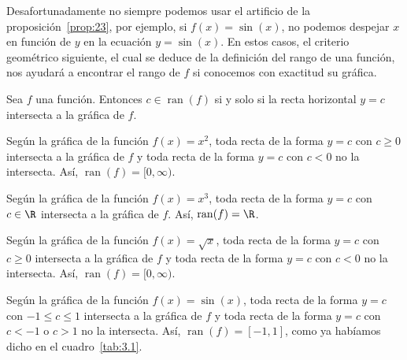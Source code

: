 \documentclass[12pt,a4paper]{book}
\DeclareMathOperator{\ran}{ran}
\begin{document}
    Desafortunadamente no siempre podemos usar el artificio de la proposición~\ref{prop:23},
    por ejemplo, si $f(x)=\sin(x)$, no podemos despejar $x$ en función de $y$
    en la ecuación $y=\sin(x)$. En estos casos, el criterio geométrico siguiente,
    el cual se deduce de la definición del rango de una función, nos ayudará a
    encontrar el rango de $f$ si conocemos con exactitud su gráfica.

    \begin{proposicion}\label{prop:24}
        Sea $f$ una función. Entonces $c\in
        \ran(f)$ si y solo si la recta horizontal $y=c$ intersecta a la gráfica de $f$.
    \end{proposicion}

    \begin{ejemplo}\label{ejm:32}
        Según la gráfica de la función $f(x)=x^{2}$, toda recta de la forma
        $y=c$ con $c\geq 0$ intersecta a la gráfica de $f$ y toda recta de la forma $y=c$
        con $c<0$ no la intersecta. Así, $\ran(f)=[0,\infty)$.
    \end{ejemplo}

    \begin{ejemplo}\label{ejm:33}
        Según la gráfica de la función $f(x)=x^{3}$, toda recta de la forma
        $y=c$ con $c\in\R$ intersecta a la gráfica de $f$. Así, $\ran(f)=\R$.
    \end{ejemplo}

    \begin{ejemplo}\label{ejm:34}
        Según la gráfica de la función $f(x)=\sqrt{x}$, toda recta de la
        forma $y=c$ con $c\geq 0$ intersecta a la gráfica de $f$ y toda recta de la forma
        $y=c$ con $c<0$ no la intersecta. Así, $\ran(f)=[0,\infty)$.
    \end{ejemplo}

    \begin{ejemplo}\label{ejm:35}
        Según la gráfica de la función $f(x)=\sin(x)$, toda recta de la
        forma $y=c$ con $-1\leq c\leq 1$ intersecta a la gráfica de $f$ y toda recta de la
        forma $y=c$ con $c<-1$ o $c>1$ no la intersecta. Así, $\ran(f)=[-1,1]$, como
        ya habíamos dicho en el cuadro~\ref{tab:3.1}.
    \end{ejemplo}
\end{document}
